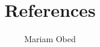 \documentclass[12pt]{report}
\title{References}
\author{Mariam Obed}
\begin{document}
\maketitle

\cite{baron1986moderator}
\cite{gao2021leisure}
\cite{hayes2009beyond}
\cite{goforth2015university}
\cite{mackinnon2002comparison}



\end{document}
